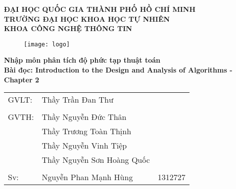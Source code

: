 \begin{titlepage}
\begin{center}
	\large{\textbf{ĐẠI HỌC QUỐC GIA THÀNH PHỐ HỒ CHÍ MINH}}\\
	\large{\textbf{TRƯỜNG ĐẠI HỌC KHOA HỌC TỰ NHIÊN}}\\
	\large{\textbf{KHOA CÔNG NGHỆ THÔNG TIN}}\\
	\vfill
	\begin{figure}[H]
		\centerline{\texttt{[image: logo]}}
	\end{figure}

	\Large{\textbf{Nhập môn phân tích độ phức tạp thuật toán}}\\
	\Large{\textbf{Bài đọc: Introduction to the Design and Analysis of Algorithms - Chapter 2}}\\

\end{center}
	\vfill
\begin{flushright}
	
	\begin{tabular}{l l l}
		GVLT: &Thầy Trần Đan Thư\\
		&\\
		GVTH: &Thầy Nguyễn Đức Thân\\
		&Thầy Trương Toàn Thịnh\\
		&Thầy Nguyễn Vinh Tiệp\\
		&Thầy Nguyễn Sơn Hoàng Quốc\\
		&\\
		Sv: &Nguyễn Phan Mạnh Hùng & 1312727\\
	\end{tabular}
\end{flushright}


\end{titlepage}
